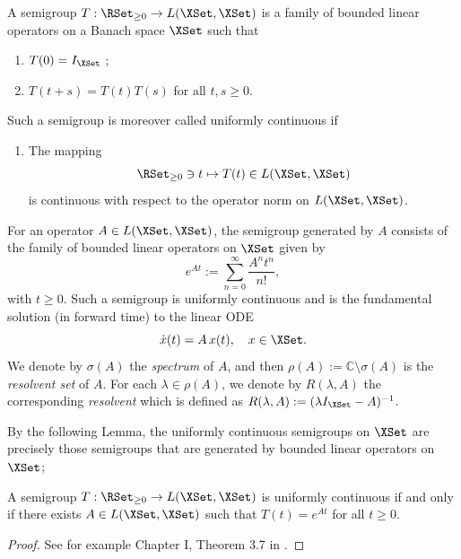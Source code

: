 \documentclass[a4paper]{siamart190516}
\begin{document}
 \begin{definition}
 A semigroup $T: \RSet_{\geq 0} \rightarrow L(\XSet, \XSet)$ is a family of bounded linear operators on a Banach space $\XSet$ such that 
 \begin{enumerate}
 \item[(i)] $T(0) = I_{\XSet}$ ;
 \item[(ii)] $T(t+s) = T(t) T(s)$ for all $t,s \geq 0$.
 \end{enumerate}
 Such a semigroup is moreover called uniformly continuous if 
  \begin{enumerate}
 \item[(iii)]  The mapping 
 \[
 \RSet_{\geq 0} \ni t \mapsto T(t) \in L(\XSet,\XSet)
 \]
  is continuous with respect to the operator norm on $L(\XSet,\XSet)$.
 \end{enumerate}

 \end{definition}
 
 For an operator $A \in L(\XSet,\XSet)$, the semigroup generated by $A$ consists of the family of bounded linear operators on $\XSet$ given by
 \[
 e^{At} := \sum_{n=0}^{\infty} \frac{A^n t^n}{n !},
 \]
with $t \geq 0$. Such a semigroup is uniformly continuous and is the fundamental solution (in forward time) to the linear ODE
\begin{equation}\label{eq:linear-ode-banach}
\dot{x}(t) = A \, x(t), \quad x \in \XSet.
\end{equation}
We denote by $\sigma(A)$ the \textit{spectrum} of $A$, and then $\rho(A) := \mathbb{C} \setminus \sigma(A)$ is the \textit{resolvent set} of $A$. For each $\lambda \in \rho(A)$, we denote by $R(\lambda,A)$ the corresponding \textit{resolvent} which is defined as $R(\lambda,A) := (\lambda I_{\XSet} - A)^{-1}$.

By the following Lemma, the uniformly continuous semigroups on $\XSet$ are precisely those semigroups that are generated by bounded linear operators on $\XSet$;

\begin{lemma}
A semigroup $T: \RSet_{\geq 0}  \rightarrow L(\XSet, \XSet)$ is uniformly continuous if and only if there exists $A \in L(\XSet, \XSet)$ such that $T(t) = e^{At}$ for all $t \geq 0$.
\end{lemma}

\begin{proof}
See for example Chapter I, Theorem 3.7 in \cite{EnNa00}.
\end{proof}
\end{document}
